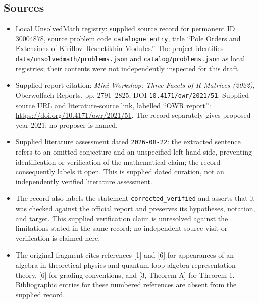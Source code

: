 \documentclass[11pt]{article}
\begin{document}
\subsection{Sources}
\begin{itemize}
\item Local UnsolvedMath registry: supplied source record for permanent ID \(30004878\), source problem code \texttt{catalogue entry}, title ``Pole Orders and Extensions of Kirillov--Reshetikhin Modules.'' The project identifies \texttt{data/unsolvedmath/problems.json} and \texttt{catalog/problems.json} as local registries; their contents were not independently inspected for this draft.
\item Supplied report citation: \emph{Mini-Workshop: Three Facets of R-Matrices (2022)}, Oberwolfach Reports, pp. 2791--2825, DOI \texttt{10.4171/owr/2021/51}. Supplied source URL and literature-source link, labelled ``OWR report'': \url{https://doi.org/10.4171/owr/2021/51}. The record separately gives proposed year 2021; no proposer is named.
\item Supplied literature assessment dated \texttt{2026-08-22}: the extracted sentence refers to an omitted conjecture and an unspecified left-hand side, preventing identification or verification of the mathematical claim; the record consequently labels it open. This is supplied dated curation, not an independently verified literature assessment.
\item The record also labels the statement \texttt{corrected\_verified} and asserts that it was checked against the official report and preserves its hypotheses, notation, and target. This supplied verification claim is unresolved against the limitations stated in the same record; no independent source visit or verification is claimed here.
\item The original fragment cites references [1] and [6] for appearances of an algebra in theoretical physics and quantum loop algebra representation theory, [6] for grading conventions, and [3, Theorem A] for Theorem 1. Bibliographic entries for these numbered references are absent from the supplied record.
\end{itemize}
\end{document}
